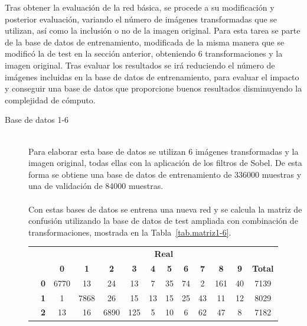 Tras obtener la evaluación de la red básica, se procede a su modificación y posterior evaluación, variando el número de imágenes transformadas que se utilizan, así como la inclusión o no de la imagen original. Para esta tarea se parte de la base de datos de entrenamiento, modificada de la misma manera que se modificó la de test en la sección anterior, obteniendo 6 transformaciones y la imagen original. Tras evaluar los resultados se irá reduciendo el número de imágenes incluidas en la base de datos de entrenamiento, para evaluar el impacto y conseguir una base de datos que proporcione buenos resultados disminuyendo la complejidad de cómputo.
\vspace{5pt}

\begin{description}
	\item[Base de datos 1-6] \hfill 
	\vspace{5pt}
	\\
	Para elaborar esta base de datos se utilizan 6 imágenes transformadas y la imagen original, todas ellas con la aplicación de los filtros de Sobel. De esta forma se obtiene una base de datos de entrenamiento de 336000 muestras y una de validación de 84000 muestras.\\
	\vspace{-10pt}
	\\
	Con estas bases de datos se entrena una nueva red y se calcula la matriz de confusión utilizando la base de datos de test ampliada con combinación de transformaciones, mostrada en la Tabla~\ref{tab.matriz1-6}.
	\begin{table}[H]
		\centering
		\begin{tabular}{|c|l|c|c|c|c|c|c|c|c|c|c|c|}
			\cline{3-13}  
			\multicolumn{2}{c|}{} & \multicolumn{11}{c|}{\textbf{Real}} \\ \cline{3-13} 
			\multicolumn{2}{c|}{} & \textbf{0} & \textbf{1} & \textbf{2} &  \textbf{3} & \textbf{4} & \textbf{5} & \textbf{6} & \textbf{7} & \textbf{8} & \textbf{9} & \textbf{Total}\\ \hline
			\multirow{10}{0.5cm}{\rotatebox{90}{\textbf{Predicción}}}& \textbf{0} & \cellcolor{lightgray}6770 & 13 & 24 & 13 & 7 & 35 & 74 & 2 & 161 & 40 & 7139\\ \cline{2-13}
			& \textbf{1} & 1 & \cellcolor{lightgray}7868 & 26 & 15 & 13 & 15 & 25 & 43 & 11 & 12 & 8029\\ \cline{2-13}
			& \textbf{2} & 13 & 16 & \cellcolor{lightgray}6890 & 125 & 5 & 10 & 6 & 62 & 47 & 8 & 7182\\ \cline{2-13}

\end{tabular}
\end{table}
\end{description}
